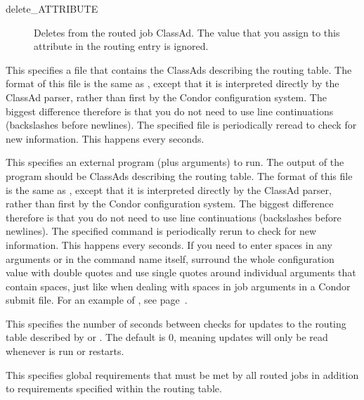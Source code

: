 \begin{description}
\begin{description}
\item[delete\_ATTRIBUTE] Deletes  from the routed job
ClassAd.  The value that you assign to this attribute in the routing
entry is ignored.

\end{description}

\item[\Macro{JOB\_ROUTER\_ENTRIES\_FILE}] \label{param:JobRouterEntriesFile}
This specifies a file that contains the ClassAds describing the
routing table.  The format of this file is the same as
, except that it is interpreted directly
by the ClassAd parser, rather than first by the Condor configuration
system.  The biggest difference therefore is that you do not need to
use line continuations (backslashes before newlines).  The specified
file is periodically reread to check for new information.  This
happens every  seconds.

\item[\Macro{JOB\_ROUTER\_ENTRIES\_CMD}]
\label{param:JobRouterEntriesCmd} This specifies an external program
(plus arguments) to run.  The output of the program should be ClassAds
describing the routing table.  The format of this file is the same as
, except that it is interpreted directly
by the ClassAd parser, rather than first by the Condor configuration
system.  The biggest difference therefore is that you do not need to
use line continuations (backslashes before newlines).  The specified
command is periodically rerun to check for new information.  This
happens every  seconds.  If you
need to enter spaces in any arguments or in the command name itself,
surround the whole configuration value with double quotes and use
single quotes around individual arguments that contain spaces, just
like when dealing with spaces in job arguments in a Condor submit
file.  For an example of , see
page~\pageref{JobRouterReSSExample}.

\item[\Macro{JOB\_ROUTER\_ENTRIES\_REFRESH}]
\label{param:JobRouterEntriesRefresh} This specifies the number of
seconds between checks for updates to the routing table described by
 or
.  The default is 0, meaning updates
will only be read whenever  is run or
 restarts.

\item[\Macro{JOB\_ROUTER\_SOURCE\_JOB\_CONSTRAINT}]
\label{JobRouterSourceJobConstraint} This specifies global
requirements that must be met by all routed jobs in addition to
requirements specified within the routing table.


\end{description}
